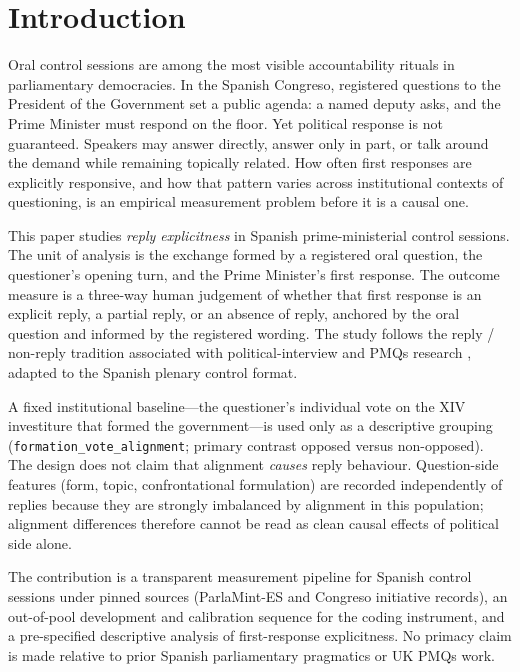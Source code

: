 \section{Introduction}
\label{sec:introduction}

Oral control sessions are among the most visible accountability rituals in
parliamentary democracies. In the Spanish Congreso, registered questions to the
President of the Government set a public agenda: a named deputy asks, and the
Prime Minister must respond on the floor. Yet political response is not
guaranteed. Speakers may answer directly, answer only in part, or talk around
the demand while remaining topically related. How often first responses are
explicitly responsive, and how that pattern varies across institutional
contexts of questioning, is an empirical measurement problem before it is a
causal one.

This paper studies \emph{reply explicitness} in Spanish prime-ministerial
control sessions. The unit of analysis is the exchange formed by a registered
oral question, the questioner's opening turn, and the Prime Minister's first
response. The outcome measure is a three-way human judgement of whether that
first response is an explicit reply, a partial reply, or an absence of reply,
anchored by the oral question and informed by the registered wording. The study
follows the reply / non-reply tradition associated with political-interview and
PMQs research \citep{bull_mayer_1993,bull_1994_identifying,bull_strawson_2020},
adapted to the Spanish plenary control format.

A fixed institutional baseline---the questioner's individual vote on the XIV
investiture that formed the government---is used only as a descriptive
grouping (\texttt{formation\_vote\_alignment}; primary contrast opposed versus
non-opposed). The design does not claim that alignment \emph{causes} reply
behaviour. Question-side features (form, topic, confrontational formulation)
are recorded independently of replies because they are strongly imbalanced by
alignment in this population; alignment differences therefore cannot be read as
clean causal effects of political side alone.

The contribution is a transparent measurement pipeline for Spanish control
sessions under pinned sources (ParlaMint-ES and Congreso initiative records),
an out-of-pool development and calibration sequence for the coding instrument,
and a pre-specified descriptive analysis of first-response explicitness. No
primacy claim is made relative to prior Spanish parliamentary pragmatics or UK
PMQs work.
